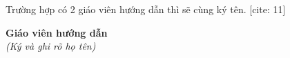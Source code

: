 \documentclass[12pt,a4paper]{report} %
\begin{document}
    \noindent Trường hợp có 2 giáo viên hướng dẫn thì sẽ cùng ký tên. [cite: 11]

    \vspace{10cm} %

    \begin{flushright}
        \begin{minipage}{0.4\textwidth}
            \centering
            \textbf{Giáo viên hướng dẫn} \\ %
            \textit{(Ký và ghi rõ họ tên)} %
        \end{minipage}
    \end{flushright}
	
	
\end{document}
